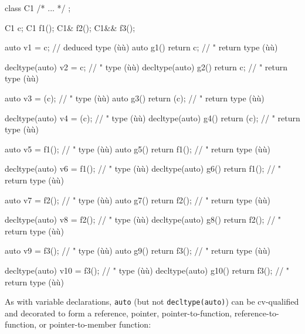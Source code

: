 \begin{emcppslisting}
class C1 { /* ... */ };

C1   c;
C1   f1();
C1&  f2();
C1&& f3();

auto           v1 = c;                 // deduced type (ù{}ù)
auto           g1() { return c; }      //    "    return type (ù{}ù)

decltype(auto) v2 = c;                 //    "    type (ù{}ù)
decltype(auto) g2() { return c; }      //    "    return type (ù{}ù)

auto           v3 = (c);               //    "    type (ù{}ù)
auto           g3() { return (c); }    //    "    return type (ù{}ù)

decltype(auto) v4 = (c);               //    "    type (ù{}ù)
decltype(auto) g4() { return (c); }    //    "    return type (ù{}ù)

auto           v5 = f1();              //    "    type (ù{}ù)
auto           g5() { return f1(); }   //    "    return type (ù{}ù)

decltype(auto) v6 = f1();              //    "    type (ù{}ù)
decltype(auto) g6() { return f1(); }   //    "    return type (ù{}ù)

auto           v7 = f2();              //    "    type (ù{}ù)
auto           g7() { return f2(); }   //    "    return type (ù{}ù)

decltype(auto) v8 = f2();              //    "    type (ù{}ù)
decltype(auto) g8() { return f2(); }   //    "    return type (ù{}ù)

auto           v9 = f3();              //    "    type (ù{}ù)
auto           g9() { return f3(); }   //    "    return type (ù{}ù)

decltype(auto) v10 = f3();             //    "    type (ù{}ù)
decltype(auto) g10() { return f3(); }  //    "    return type (ù{}ù)
\end{emcppslisting}
    

\noindent As with variable declarations, \lstinline!auto! (but not
\lstinline!decltype(auto)!) can be cv-qualified and decorated to form a
reference, pointer, pointer-to-function, reference-to-function, or
pointer-to-member function:


